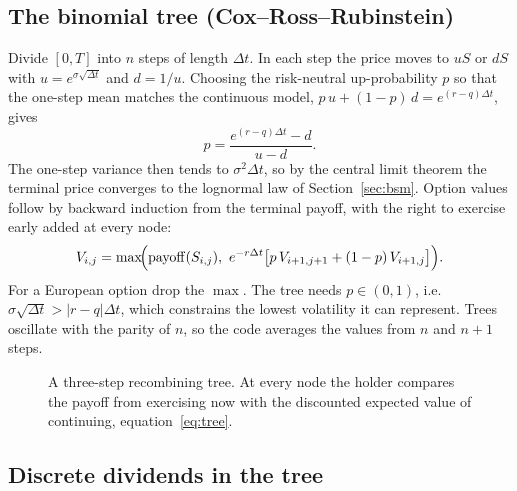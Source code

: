 \documentclass[11pt]{article}
\begin{document}
\subsection{The binomial tree (Cox--Ross--Rubinstein)}\label{sec:crr}

Divide $[0,T]$ into $n$ steps of length $\Delta t$. In each step the price moves
to $uS$ or $dS$ with $u=e^{\sigma\sqrt{\Delta t}}$ and $d=1/u$. Choosing the
risk-neutral up-probability $p$ so that the one-step mean matches the continuous
model, $p\,u+(1-p)\,d=e^{(r-q)\Delta t}$, gives
\begin{equation}
  p=\frac{e^{(r-q)\Delta t}-d}{u-d}.
\end{equation}
The one-step variance then tends to $\sigma^2\Delta t$, so by the central limit
theorem the terminal price converges to the lognormal law of
Section~\ref{sec:bsm}. Option values follow by backward induction from the
terminal payoff, with the right to exercise early added at every node:
\begin{equation}\label{eq:tree}
  V_{i,j}=\max\!\Bigl(\mathrm{payoff}(S_{i,j}),\ e^{-r\Delta t}\bigl[p\,V_{i+1,j+1}+(1-p)\,V_{i+1,j}\bigr]\Bigr).
\end{equation}
For a European option drop the $\max$. The tree needs $p\in(0,1)$, i.e.
$\sigma\sqrt{\Delta t}>|r-q|\Delta t$, which constrains the lowest volatility it
can represent. Trees oscillate with the parity of $n$, so the code averages the
values from $n$ and $n+1$ steps.

\begin{figure}[ht]
\centering
{}
\caption{A three-step recombining tree. At every node the holder compares the
payoff from exercising now with the discounted expected value of continuing,
equation~\eqref{eq:tree}.}
\end{figure}

\subsection{Discrete dividends in the tree}
\end{document}
